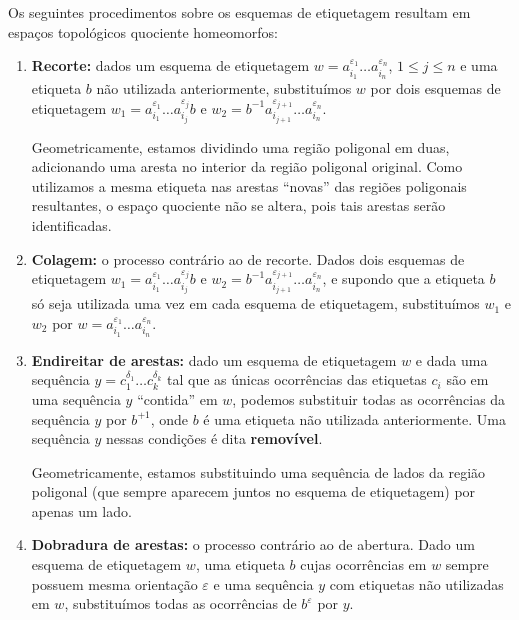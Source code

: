 \begin{prop}
    Os seguintes procedimentos sobre os esquemas de etiquetagem resultam em espaços topológicos quociente homeomorfos:
    \begin{enumerate}
        \item \textbf{Recorte:} dados um esquema de etiquetagem $w = a_{i_1}^{\varepsilon_1} \ldots a_{i_n}^{\varepsilon_n}$, $1\leq j\leq n$ e uma etiqueta $b$ não utilizada anteriormente, substituímos $w$ por dois esquemas de etiquetagem $w_1 = a_{i_1}^{\varepsilon_1} \ldots a_{i_j}^{\varepsilon_j} b$ e $w_2 = b^{-1} a_{i_{j+1}}^{\varepsilon_{j+1}} \ldots a_{i_n}^{\varepsilon_n}$.
        
        Geometricamente, estamos dividindo uma região poligonal em duas, adicionando uma aresta no interior da região poligonal original. Como utilizamos a mesma etiqueta nas arestas ``novas'' das regiões poligonais resultantes, o espaço quociente não se altera, pois tais arestas serão identificadas.
    
        \item \textbf{Colagem:} o processo contrário ao de recorte. Dados dois esquemas de etiquetagem $w_1 = a_{i_1}^{\varepsilon_1} \ldots a_{i_j}^{\varepsilon_j} b$ e $w_2 = b^{-1} a_{i_{j+1}}^{\varepsilon_{j+1}} \ldots a_{i_n}^{\varepsilon_n}$, e supondo que a etiqueta $b$ só seja utilizada uma vez em cada esquema de etiquetagem, substituímos $w_1$ e $w_2$ por $w = a_{i_1}^{\varepsilon_1} \ldots a_{i_n}^{\varepsilon_n}$.
    
        \item \textbf{Endireitar de arestas:} dado um esquema de etiquetagem $w$ e dada uma sequência $y = c_1^{\delta_1} \ldots c_k^{\delta_k}$ tal que as únicas ocorrências das etiquetas $c_i$ são em uma sequência $y$ ``contida'' em $w$, podemos substituir todas as ocorrências da sequência $y$ por $b^{+1}$, onde $b$ é uma etiqueta não utilizada anteriormente. Uma sequência $y$ nessas condições é dita \textbf{removível}.
    
        Geometricamente, estamos substituindo uma sequência de lados da região poligonal (que sempre aparecem juntos no esquema de etiquetagem) por apenas um lado.
    
        \item \textbf{Dobradura de arestas:} o processo contrário ao de abertura. Dado um esquema de etiquetagem $w$, uma etiqueta $b$ cujas ocorrências em $w$ sempre possuem mesma orientação $\varepsilon$ e uma sequência $y$ com etiquetas não utilizadas em $w$, substituímos todas as ocorrências de $b^{\varepsilon}$ por $y$.
    

\end{enumerate}
\end{prop}
